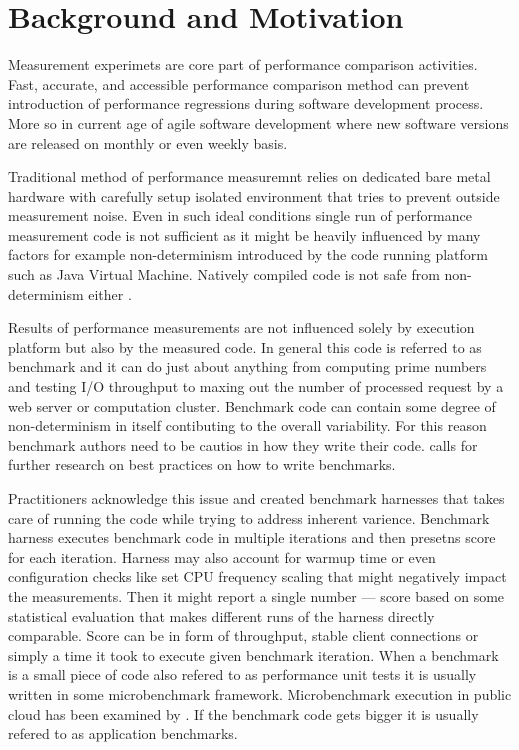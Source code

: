 \chapter{Background and Motivation}
\label{chap:background}

Measurement experimets are core part of performance comparison activities.
Fast, accurate, and accessible  performance comparison method can prevent introduction of performance regressions during software development process.
More so in current age of agile software development where new software versions are released on monthly or even weekly basis.

Traditional method of performance measuremnt relies on dedicated bare metal hardware with carefully setup isolated environment that tries to prevent outside measurement noise. 
Even in such ideal conditions single run of performance measurement code is not sufficient as it might be heavily influenced by many factors for example non-determinism introduced by the code running platform such as Java Virtual Machine.
Natively compiled code is not safe from non-determinism either .

Results of performance measurements are not influenced solely by execution platform but also by the measured code.
In general this code is referred to as benchmark and it can do just about anything from computing prime numbers and testing I/O throughput to maxing out the number of processed request by a web server or computation cluster.
Benchmark code can contain some degree of non-determinism in itself contibuting to the overall variability.
For this reason benchmark authors need to be cautios in how they write their code.
\citet{laaber2019software} calls for further research on best practices on how to write benchmarks.

Practitioners acknowledge this issue and created benchmark harnesses that takes care of running the code while trying to address inherent varience.
Benchmark harness executes benchmark code in multiple iterations and then presetns score for each iteration.
Harness may also account for warmup time or even configuration checks like set CPU frequency scaling that might negatively impact the measurements.
Then it might report a single number --- score based on some statistical evaluation that makes different runs of the harness directly comparable.
Score can be in form of throughput, stable client connections or simply a time it took to execute given benchmark iteration.
When a benchmark is a small piece of code also refered to as performance unit tests \citet{horky2015unit} it is usually written in some microbenchmark framework.
Microbenchmark execution in public cloud has been examined by \citet{laaber2019software}.
If the benchmark code gets bigger it is usually refered to as application benchmarks.

